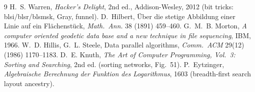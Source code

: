 \documentclass[11pt,a4paper]{report}
\begin{document}
\begin{thebibliography}{9}
 H.~S. Warren, \emph{Hacker's Delight}, 2nd ed.,
Addison-Wesley, 2012 (bit tricks: blsi/blsr/blsmsk, Gray, funnel).
 D.~Hilbert, \"Uber die stetige Abbildung einer Linie
auf ein Fl\"achenst\"uck, \emph{Math.\ Ann.} 38 (1891) 459--460.
 G.~M.~B. Morton, \emph{A computer oriented geodetic
data base and a new technique in file sequencing}, IBM, 1966.
 W.~D. Hillis, G.~L. Steele, Data parallel algorithms,
\emph{Comm.\ ACM} 29(12) (1986) 1170--1183.
 D.~E. Knuth, \emph{The Art of Computer Programming,
Vol.~3: Sorting and Searching}, 2nd ed. (sorting networks, Fig.~51).
 P.~Eytzinger, \emph{Algebraische Berechnung der
Funktion des Logarithmus}, 1603 (breadth-first search layout ancestry).
\end{thebibliography}
\end{document}
